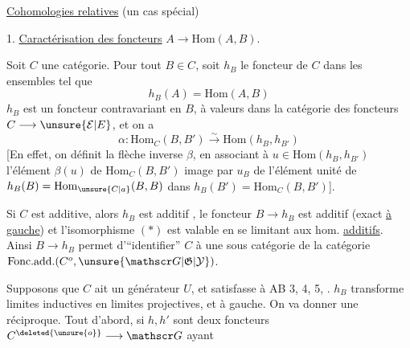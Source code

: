\uline{Cohomologies relatives} (un cas spécial)

1. \uline{Caractérisation des foncteurs} $A\longrightarrow\mathrm{Hom}(A,B)$.

Soit $C$ une catégorie. Pour tout $B\in C$, soit $h_B$ le foncteur de $C$ dans les ensembles tel que
\[
 h_B(A)=\mathrm{Hom}(A,B)
\]
$h_B$ est un foncteur  contravariant en $B$, à valeurs dans la catégorie des foncteurs $C\longrightarrow\unsure{\mathcal E|E}$, et on a
\[
 \alpha:\mathrm{Hom}_C(B,B')\xrightarrow{\sim}\mathrm{Hom}(h_B,h_{B'}) \tag*{(*)}
\]
[En effet, on définit la flèche inverse $\beta$, en associant à  $u\in\mathrm{Hom}(h_B,h_{B'})$  l'élément $\beta(u)$ de $\mathrm{Hom}_C(B,B')$ image par $u_B$ de l'élément unité de $h_B(B)=\mathrm{Hom}_{\unsure{C|a}}(B,B)$ dans $h_B(B')=\mathrm{Hom}_C(B,B')$].

 Si $C$ est additive, alors $h_B$ est additif , le foncteur $B\longrightarrow h_B$ est additif (exact \uline{à gauche}) et l'isomorphisme $(*)$ est valable en se limitant aux hom. \uline{additifs}. Ainsi $B\longrightarrow h_B$  permet d'``identifier'' $C$ à une sous catégorie de la catégorie $\mathrm{Fonc.add.}(C^o,\unsure{\mathscr G|\mathfrak G|\mathcal Y})$.

Supposons que $C$ ait un générateur $U$, et  satisfasse à AB 3, 4, 5, .    $h_B$ transforme limites inductives en limites projectives, et   à gauche. On va donner une réciproque. Tout d'abord, si $h,h'$ sont deux foncteurs  $C^{\deleted{\unsure{o}}}\longrightarrow\mathscr G$ ayant
